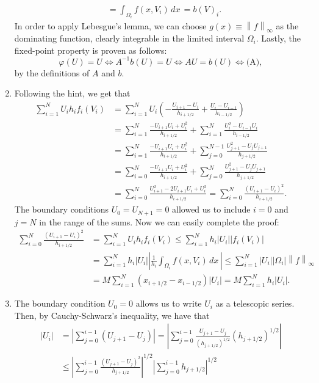 \documentclass[a4paper]{article}
\newcommand{\dx}{\, dx \,}
\newcommand{\abs}[1]{\left\lvert #1 \right\rvert}
\newcommand{\norm}[1]{\left\lVert #1 \right\rVert}
\begin{document}
\begin{enumerate}[label=\textbf{\alph*)},leftmargin=*]
\begin{align*}
&	= \int_{\Omega_i} f(x,V_i) \dx
	= b(V)_i.
	\end{align*}
	In order to apply Lebesgue's lemma, we can choose $g(x) \equiv \norm{f}_\infty$
	as the dominating function, clearly integrable in the limited interval $\Omega_i$.
	Lastly, the fixed-point property is proven as follows:
	\[
	\varphi(U) = U
	\iff A^{-1} b(U) = U
	\iff AU = b(U)
	\iff \text{(A)},
	\]
	by the definitions of $A$ and $b$.
\item Following the hint, we get that
	\begin{align*}
	\sum_{i=1}^N U_i h_i f_i(V_i)
&	= \sum_{i=1}^N U_i \left( -\frac{U_{i+1}-U_i}{h_{i+1/2}}
                              +\frac{U_i-U_{i-1}}{h_{i-1/2}} \right) \\
&	= \sum_{i=1}^N \frac{-U_{i+1}U_i+U_i^2}{h_{i+1/2}}
    + \sum_{i=1}^N \frac{U^2_i-U_{i-1}U_i}{h_{i-1/2}} \\
&	= \sum_{i=1}^N \frac{-U_{i+1}U_i+U_i^2}{h_{i+1/2}}
	+ \sum_{j=0}^{N-1} \frac{U^2_{j+1}-U_jU_{j+1}}{h_{j+1/2}} \\
&	= \sum_{i=0}^N \frac{-U_{i+1}U_i+U_i^2}{h_{i+1/2}}
	+ \sum_{j=0}^N \frac{U^2_{j+1}-U_jU_{j+1}}{h_{j+1/2}} \\
&	= \sum^N_{i=0} \frac{U_{i+1}^2-2U_{i+1}U_i+U_i^2}{h_{i+1/2}}
	= \sum^N_{i=0} \frac{(U_{i+1}-U_i)^2}{h_{i+1/2}}.
	\end{align*}
	The boundary conditions $U_0 = U_{N+1} = 0$ allowed us to include
	$i=0$ and $j=N$ in the range of the sums.
	Now we can easily complete the proof:
	\begin{align*}
	\sum^N_{i=0} \frac{(U_{i+1}-U_i)^2}{h_{i+1/2}}
&	= \sum_{i=1}^N U_i h_i f_i(V_i)
	\leq \sum_{i=1}^N h_i \abs{U_i} \abs{f_i(V_i)} \\
&	= \sum_{i=1}^N h_i \abs{U_i} \abs{\frac{1}{h_i} \int_{\Omega_i} f(x,V_i) \dx}
	\leq \sum_{i=1}^N \abs{U_i} \abs{\Omega_i} \norm{f}_\infty \\
&	= M \sum_{i=1}^N (x_{i+1/2}-x_{i-1/2}) \abs{U_i}
	= M \sum_{i=1}^N h_i \abs{U_i}.
	\end{align*}
\item The boundary condition $U_0 = 0$ allows us to write $U_i$ as a telescopic series.
	Then, by Cauchy-Schwarz's inequality, we have that
	\begin{align*}
	|U_i|
&	= \abs{ \sum_{j=0}^{i-1} (U_{j+1}-U_j) }
	= \abs{ \sum_{j=0}^{i-1} \frac{U_{j+1}-U_j}{(h_{j+1/2})^{1/2}} (h_{j+1/2})^{1/2} } \\
&	\leq \abs{ \sum^{i-1}_{j=0}\frac{(U_{j+1}-U_j)^2}{h_{j+1/2}} }^{1/2}
	     \abs{ \sum^{i-1}_{j=0}h_{j+1/2} }^{1/2} \\

\end{align*}
\end{enumerate}
\end{document}
